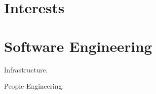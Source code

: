 \documentclass[]{deedy-resume-openfont}
\begin{document}
\begin{minipage}[t]{0.33	\textwidth}

\section{Interests}



\sectionsep


%
%

\end{minipage} 
\hfill
\begin{minipage}[t]{0.66\textwidth} 


\section{Software Engineering}

\vspace{\topsep} %
\begin{tightemize}
\item Infrastructure.
\end{tightemize}
\sectionsep


\begin{tightemize}
\item People Engineering.
\end{tightemize}
\sectionsep


\end{minipage}
\end{document}

